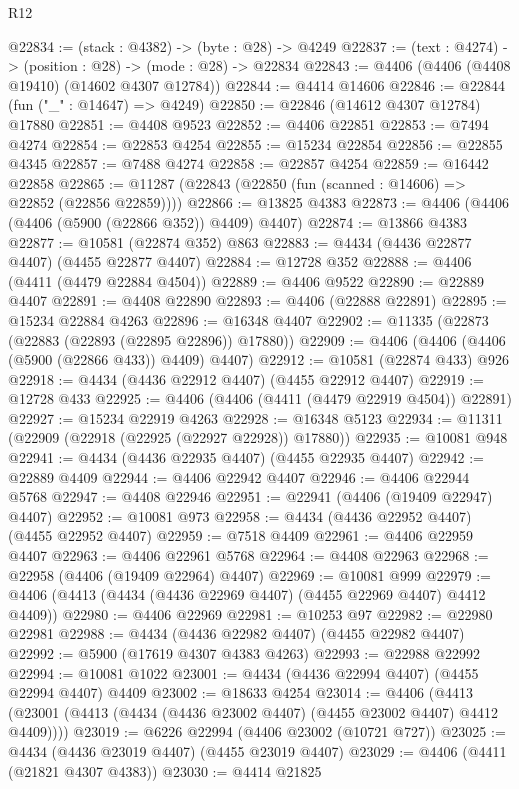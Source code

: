 \begin{lexlean}{R12}
\begin{coremodule}
@22834 := (stack : @4382) -> (byte : @28) -> @4249
@22837 := (text : @4274) -> (position : @28) -> (mode : @28) -> @22834
@22843 := @4406 (@4406 (@4408 @19410) (@14602 @4307 @12784))
@22844 := @4414 @14606
@22846 := @22844 (fun ("_" : @14647) => @4249)
@22850 := @22846 (@14612 @4307 @12784) @17880
@22851 := @4408 @9523
@22852 := @4406 @22851
@22853 := @7494 @4274
@22854 := @22853 @4254
@22855 := @15234 @22854
@22856 := @22855 @4345
@22857 := @7488 @4274
@22858 := @22857 @4254
@22859 := @16442 @22858
@22865 := @11287 (@22843 (@22850 (fun (scanned : @14606) => @22852 (@22856 @22859))))
@22866 := @13825 @4383
@22873 := @4406 (@4406 (@4406 (@5900 (@22866 @352)) @4409) @4407)
@22874 := @13866 @4383
@22877 := @10581 (@22874 @352) @863
@22883 := @4434 (@4436 @22877 @4407) (@4455 @22877 @4407)
@22884 := @12728 @352
@22888 := @4406 (@4411 (@4479 @22884 @4504))
@22889 := @4406 @9522
@22890 := @22889 @4407
@22891 := @4408 @22890
@22893 := @4406 (@22888 @22891)
@22895 := @15234 @22884 @4263
@22896 := @16348 @4407
@22902 := @11335 (@22873 (@22883 (@22893 (@22895 @22896)) @17880))
@22909 := @4406 (@4406 (@4406 (@5900 (@22866 @433)) @4409) @4407)
@22912 := @10581 (@22874 @433) @926
@22918 := @4434 (@4436 @22912 @4407) (@4455 @22912 @4407)
@22919 := @12728 @433
@22925 := @4406 (@4406 (@4411 (@4479 @22919 @4504)) @22891)
@22927 := @15234 @22919 @4263
@22928 := @16348 @5123
@22934 := @11311 (@22909 (@22918 (@22925 (@22927 @22928)) @17880))
@22935 := @10081 @948
@22941 := @4434 (@4436 @22935 @4407) (@4455 @22935 @4407)
@22942 := @22889 @4409
@22944 := @4406 @22942 @4407
@22946 := @4406 @22944 @5768
@22947 := @4408 @22946
@22951 := @22941 (@4406 (@19409 @22947) @4407)
@22952 := @10081 @973
@22958 := @4434 (@4436 @22952 @4407) (@4455 @22952 @4407)
@22959 := @7518 @4409
@22961 := @4406 @22959 @4407
@22963 := @4406 @22961 @5768
@22964 := @4408 @22963
@22968 := @22958 (@4406 (@19409 @22964) @4407)
@22969 := @10081 @999
@22979 := @4406 (@4413 (@4434 (@4436 @22969 @4407) (@4455 @22969 @4407) @4412 @4409))
@22980 := @4406 @22969
@22981 := @10253 @97
@22982 := @22980 @22981
@22988 := @4434 (@4436 @22982 @4407) (@4455 @22982 @4407)
@22992 := @5900 (@17619 @4307 @4383 @4263)
@22993 := @22988 @22992
@22994 := @10081 @1022
@23001 := @4434 (@4436 @22994 @4407) (@4455 @22994 @4407) @4409
@23002 := @18633 @4254
@23014 := @4406
    (@4413 (@23001 (@4413 (@4434 (@4436 @23002 @4407) (@4455 @23002 @4407) @4412 @4409))))
@23019 := @6226 @22994 (@4406 @23002 (@10721 @727))
@23025 := @4434 (@4436 @23019 @4407) (@4455 @23019 @4407)
@23029 := @4406 (@4411 (@21821 @4307 @4383))
@23030 := @4414 @21825

\end{coremodule}
\end{lexlean}
